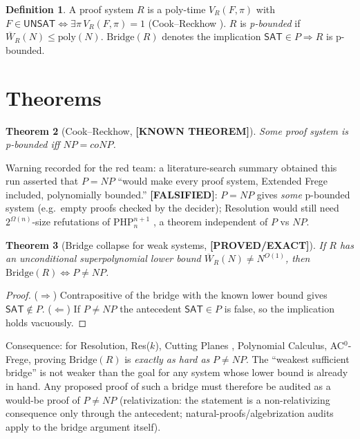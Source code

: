 \documentclass[11pt]{article}
\newtheorem{theorem}{Theorem}
\theoremstyle{definition}
\newtheorem{definition}[theorem]{Definition}
\newcommand{\SAT}{\mathsf{SAT}}
\newcommand{\UNSAT}{\mathsf{UNSAT}}
\newcommand{\WR}{\overline W_R}
\newcommand{\st}[1]{\textbf{[#1]}}
\begin{document}
\begin{definition}
A proof system $R$ is a poly-time $V_R(F,\pi)$ with $F\in\UNSAT\iff\exists\pi\,V_R(F,\pi)=1$
(Cook--Reckhow \cite{cr}). $R$ is \emph{p-bounded} if $\WR(N)\le\mathrm{poly}(N)$.
$\mathrm{Bridge}(R)$ denotes the implication $\SAT\in P\Rightarrow R$ is p-bounded.
\end{definition}

\section{Theorems}
\begin{theorem}[Cook--Reckhow, \st{KNOWN THEOREM}]
Some proof system is p-bounded iff $NP=coNP$.
\end{theorem}
\noindent Warning recorded for the red team: a literature-search summary obtained this run
asserted that $P=NP$ ``would make every proof system, Extended Frege included, polynomially
bounded.'' \st{FALSIFIED}: $P=NP$ gives \emph{some} p-bounded system (e.g.\ empty proofs
checked by the decider); Resolution would still need $2^{\Omega(n)}$-size refutations of
$\mathrm{PHP}^{n+1}_n$ \cite{haken}, a theorem independent of $P$ vs $NP$.

\begin{theorem}[Bridge collapse for weak systems, \st{PROVED/EXACT}]
If $R$ has an unconditional superpolynomial lower bound $\WR(N)\ne N^{O(1)}$, then
$\mathrm{Bridge}(R)\iff P\ne NP$.
\end{theorem}
\begin{proof}
($\Rightarrow$) Contrapositive of the bridge with the known lower bound gives $\SAT\notin P$.
($\Leftarrow$) If $P\ne NP$ the antecedent $\SAT\in P$ is false, so the implication holds vacuously.
\end{proof}
\noindent Consequence: for Resolution, Res($k$), Cutting Planes \cite{pud}, Polynomial
Calculus, AC$^0$-Frege, proving $\mathrm{Bridge}(R)$ is \emph{exactly as hard as} $P\ne NP$.
The ``weakest sufficient bridge'' is not weaker than the goal for any system whose lower
bound is already in hand. Any proposed proof of such a bridge must therefore be audited as
a would-be proof of $P\ne NP$ (relativization: the statement is a non-relativizing
consequence only through the antecedent; natural-proofs/algebrization audits apply to the
bridge argument itself).
\end{document}

